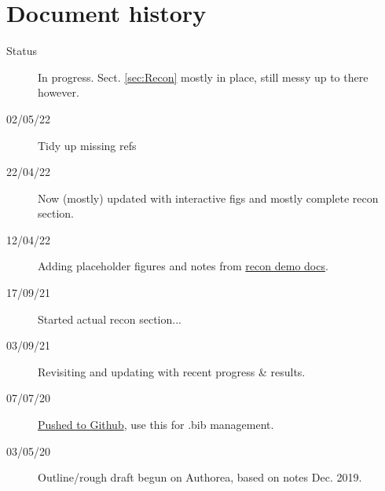 \section*{Document history}

\begin{description}
\item [{Status}] In progress. Sect. \ref{sec:Recon} mostly in place, still messy up to there however.
\item [{02/05/22}] Tidy up missing refs 
\item [{22/04/22}] Now (mostly) updated with interactive figs and mostly complete recon section.
\item [{12/04/22}] Adding placeholder figures and notes from \href{https://pemtk.readthedocs.io/en/latest/fitting/PEMtk_analysis_demo_150621-tidy.html}{recon demo docs}.
\item [{17/09/21}] Started actual recon section...
\item [{03/09/21}] Revisiting and updating with recent progress \& results.
\item [{07/07/20}] \href{https://github.com/phockett/Extracting-Molecular-Frame-Photoionization-Dynamics-from-Experimental-Data}{Pushed to Github}, use this for .bib management.
\item [{03/05/20}] Outline/rough draft begun on Authorea, based on notes Dec. 2019.
\end{description}